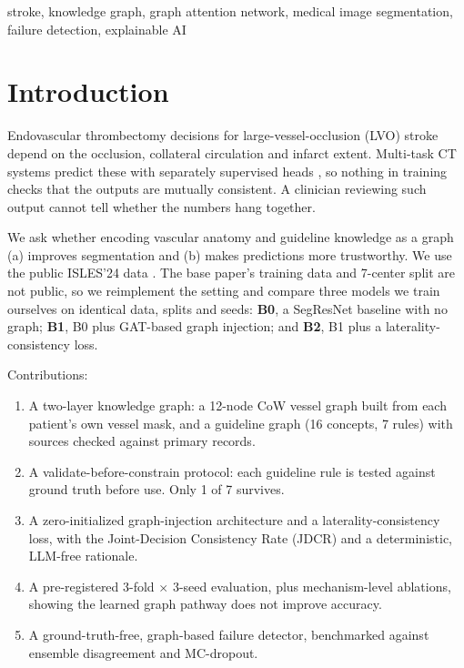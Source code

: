 \documentclass[conference]{IEEEtran}
\begin{document}
\begin{IEEEkeywords}
stroke, knowledge graph, graph attention network, medical image segmentation, failure detection, explainable AI
\end{IEEEkeywords}

\section{Introduction}
Endovascular thrombectomy decisions for large-vessel-occlusion (LVO) stroke depend on the occlusion, collateral circulation and infarct extent. Multi-task CT systems predict these with separately supervised heads \cite{luan2026}, so nothing in training checks that the outputs are mutually consistent. A clinician reviewing such output cannot tell whether the numbers hang together.

We ask whether encoding vascular anatomy and guideline knowledge as a graph (a) improves segmentation and (b) makes predictions more trustworthy. We use the public ISLES'24 data \cite{isles2024}. The base paper's training data and 7-center split are not public, so we reimplement the setting and compare three models we train ourselves on identical data, splits and seeds: \textbf{B0}, a SegResNet baseline with no graph; \textbf{B1}, B0 plus GAT-based graph injection; and \textbf{B2}, B1 plus a laterality-consistency loss.

Contributions:
\begin{enumerate}
\item A two-layer knowledge graph: a 12-node CoW vessel graph built from each patient's own vessel mask, and a guideline graph (16 concepts, 7 rules) with sources checked against primary records.
\item A validate-before-constrain protocol: each guideline rule is tested against ground truth before use. Only 1 of 7 survives.
\item A zero-initialized graph-injection architecture and a laterality-consistency loss, with the Joint-Decision Consistency Rate (JDCR) and a deterministic, LLM-free rationale.
\item A pre-registered 3-fold $\times$ 3-seed evaluation, plus mechanism-level ablations, showing the learned graph pathway does not improve accuracy.
\item A ground-truth-free, graph-based failure detector, benchmarked against ensemble disagreement and MC-dropout.
\end{enumerate}
\end{document}
